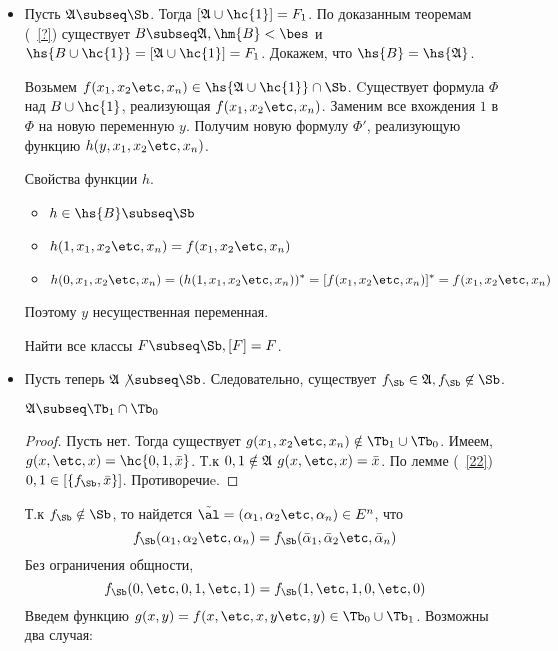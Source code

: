 \documentclass[unicode,10pt]{article}
\begin{document}
\begin{itemize}
\item Пусть $\ag\subseq\Sb$.
  Тогда $[\ag\cup\hc{1}] = F_1$. По доказанным теоремам (~\ref{?})
  существует $B\subseq\ag, \hm{B}<\bes$ и $\hs{B\cup\hc{1}} = [\ag\cup\hc{1}]=F_1$.
  Докажем, что $\hs{B}=\hs{\ag}$.\par
  Возьмем $f(\set[x]{n})\in\hs{\ag\cup\hc{1}}\cap\Sb$.
  Cуществует формула $\Phi$ над $B\cup\hc{1}$, реализующая $f(\set[x]{n})$.
  Заменим все вхождения $1$ в $\Phi$ на новую переменную $y$.
  Получим новую формулу $\Phi'$, реализующую функцию $h(y,\set[x]{n})$.
  \par Свойства функции $h$.
  \begin{itemize}
    \item $\displaystyle h\in \hs{B} \subseq \Sb$
    \item $\displaystyle h(1,\set[x]{n}) = f(\set[x]{n})$
    \item $\displaystyle h(0,\set[x]{n}) = (h(1,\set[x]{n}))^* = [f(\set[x]{n})]^*=f(\set[x]{n})$
  \end{itemize}
  Поэтому $y$ несущественная переменная.
  \begin{problem}
    Найти все классы $F\subseq\Sb,[F]=F$.
  \end{problem}
  \item Пусть теперь $\ag\not\subseq\Sb$.
    Следовательно, существует $\fS\in\ag,\fS\not\in\Sb$.
    \begin{lemma}
      $\displaystyle \ag\subseq\Tb_1\cap\Tb_0$
    \end{lemma}
    \begin{proof}
      Пусть нет. Тогда существует $g(\set[x]{n})\notin\Tb_1\cup\Tb_0$.
      Имеем, $g(x,\etc,x) = \hc{ 0, 1, \bar x}$. Т.к $0,1\notin\mathfrak{A}$ $g(x,\etc,x)=\bar x$.
      По лемме (~\ref{22})  $0,1 \in \cls{\fS,\bar x}$. Противоречиe.
    \end{proof}
    Т.к $\fS\notin\Sb$, то найдется $\alt = (\set{n})\in E^n$, что
    \begin{displaymath}
      \fS(\set{n}) = \fS(\set[\bar \alpha]{n})
    \end{displaymath}
      Без ограничения общности,
      \begin{displaymath}
        \fS(0,\etc,0,1,\etc,1) = \fS(1,\etc,1,0,\etc, 0)
      \end{displaymath}
      Введем функцию  $ g(x,y)=f(x,\etc,x,y\etc,y) \in\Tb_0\cup\Tb_1$.
      Возможны два случая:\par
      \begin{enumerate}

\end{enumerate}
\end{itemize}
\end{document}
